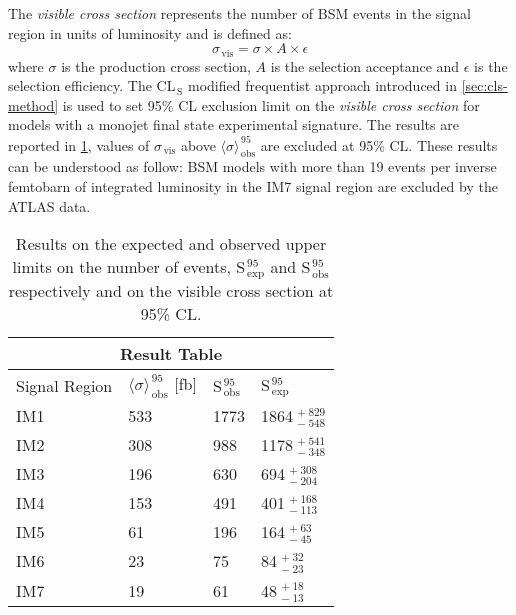 The \emph{visible cross section} represents the number of BSM events in the
signal region in units of luminosity and is defined as:
\begin{equation}
  \label{eq:113}
  \sigma_\mathrm{\, vis} = \sigma \times A \times \epsilon
\end{equation}
where $\sigma$ is the production cross section, $A$ is the selection acceptance
and $\epsilon$ is the selection efficiency. The CL$_\mathrm{\, S}$ modified
frequentist approach introduced in \cref{sec:cls-method} is used to
set 95\% CL exclusion limit on the \emph{visible cross section} for models with
a monojet final state experimental signature. The results are reported in
\cref{tab:cs_vis_results}, values of $\sigma_\mathrm{\, vis}$ above
$\langle \sigma \rangle_\mathrm{\, obs}^{\, 95}$ are excluded at 95\%
CL\@. These results can be understood as follow: BSM models with more than 19
events per inverse femtobarn of integrated luminosity in the IM7 signal region
are excluded by the ATLAS data.
\begin{table}[!h]
  \centering
  \begin{tabular}{llll}
    \toprule
    \multicolumn{4}{c}{Result Table} \\
    \midrule \midrule
    Signal Region & $\langle \sigma \rangle_\mathrm{\, obs}^{\, 95}$ [fb] & S$_\mathrm{\, obs}^{\, 95}$ & S$_\mathrm{\, exp}^{\, 95}$ \\
    \midrule
    IM1 & 533 & 1773 & 1864$_{\, -548}^{\, +829}$ \B \\
    IM2 & 308 & 988 & 1178$_{\, -348}^{\, +541}$ \T \B \\
    IM3 & 196 & 630 & 694$_{\, -204}^{\, +308}$ \T \B \\
    IM4 & 153 & 491 & 401$_{\, -113}^{\, +168}$ \T \B \\
    IM5 & 61 & 196 & 164$_{\, -45}^{\, +63}$ \T \B \\
    IM6 & 23 & 75 & 84$_{\, -23}^{\, +32}$ \T \B\\
    IM7 & 19 & 61 & 48$_{\, -13}^{\, +18}$ \T \\
    \bottomrule
  \end{tabular}
  \caption{Results on the expected and observed upper limits on the number of
    events, S$_\mathrm{\, exp}^{\, 95}$ and S$_\mathrm{\, obs}^{\, 95}$
    respectively and on the visible cross section at 95\% CL.}
  \label{tab:cs_vis_results}
\end{table}
